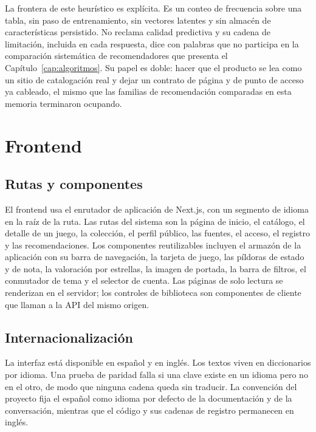 La frontera de este heurístico es explícita. Es un conteo de frecuencia sobre una tabla, sin
paso de entrenamiento, sin vectores latentes y sin almacén de características persistido. No
reclama calidad predictiva y su cadena de limitación, incluida en cada respuesta, dice con
palabras que no participa en la comparación sistemática de recomendadores que presenta el
Capítulo~\ref{cap:algoritmos}. Su papel es doble: hacer que el
producto se lea como un sitio de catalogación real y dejar un contrato de página y de punto
de acceso ya cableado, el mismo que las familias de recomendación comparadas en esta memoria
terminaron ocupando.

\section{Frontend}\label{sec:impl-frontend}

\subsection{Rutas y componentes}\label{sec:impl-rutas}

El frontend usa el enrutador de aplicación de Next.js, con un segmento de idioma en la raíz de
la ruta. Las rutas del sistema son la página de inicio, el catálogo, el detalle de un
juego, la colección, el perfil público, las fuentes, el acceso, el registro y las
recomendaciones. Los componentes reutilizables incluyen el armazón de la aplicación con su
barra de navegación, la tarjeta de juego, las píldoras de estado y de nota, la valoración por
estrellas, la imagen de portada, la barra de filtros, el conmutador de tema y el selector de
cuenta. Las páginas de solo lectura se renderizan en el servidor; los controles de biblioteca
son componentes de cliente que llaman a la API del mismo origen.

\subsection{Internacionalización}\label{sec:impl-i18n}

La interfaz está disponible en español y en inglés. Los textos viven en diccionarios por
idioma. Una prueba de paridad falla si una clave existe en un idioma pero no en el otro, de
modo que ninguna cadena queda sin traducir. La convención del proyecto fija el español como
idioma por defecto de la documentación y de la conversación, mientras que el código y sus
cadenas de registro permanecen en inglés.

